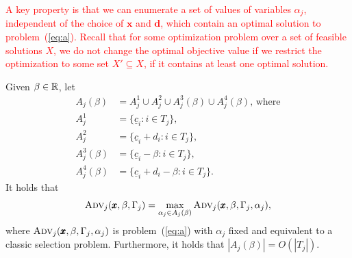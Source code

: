 \textcolor{red}{A key property is that we can enumerate a set of values of variables $\alpha_j$, independent of the choice of $\pmb{x}$ and $\pmb{d}$, which contain an optimal solution to problem~(\ref{eq:a}). Recall that for some optimization problem over a set of feasible solutions $X$, we do not change the optimal objective value if we restrict the optimization to some set $X'\subseteq X$, if it contains at least one optimal solution.}
\begin{lemma}
\label{lemma:alpha_j_discrete}
  Given $\beta \in \mathbb{R}$, let
  \begin{align*}
    A_j(\beta) &= A^1_j \cup A^2_j \cup A^3_j(\beta) \cup A^4_j(\beta) \text{, where}  \\
    A^1_j &= \{ \underline{c}_i : i\in T_j \}, \\
    A^2_j &= \{  \underline{c}_i + d_i  : i \in T_j \},  \\
    A^3_j(\beta) &= \{\underline{c}_i - \beta : i\in T_j\}, \\
    A^4_j(\beta) &= \{\underline{c}_i +d_i - \beta : i \in T_j \}.
    \end{align*}
  It holds that 
  \[ \textsc{Adv}_j(\pmb{x},\beta,\Gamma_j) = \max_{\alpha_j \in A_j(\beta)} \textsc{Adv}_j(\pmb{x},\beta,\Gamma_j,\alpha_j), \]
  where $\textsc{Adv}_j(\pmb{x},\beta,\Gamma_j,\alpha_j)$ is problem~(\ref{eq:a}) with $\alpha_j$ fixed and 
  equivalent to a classic selection problem. Furthermore, it holds that $|A_j(\beta)| = O(|T_j|)$.
\end{lemma}
